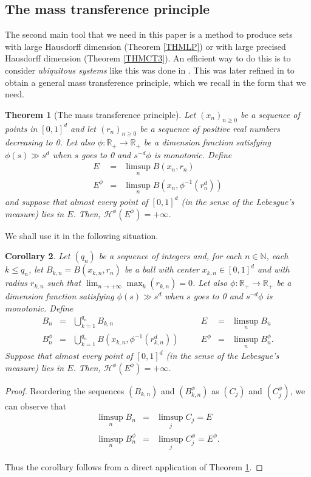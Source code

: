 \documentclass[11pt,a4paper]{amsart}
\theoremstyle{plain}
\newtheorem{theorem}{Theorem}[section]
\newtheorem{corollary}[theorem]{Corollary}
\begin{document}
\subsection{The mass transference principle}

The second main tool that we need in this paper is a method to produce sets with large Hausdorff dimension (Theorem \ref{THMLP})
or with large precised Hausdorff dimension (Theorem \ref{THMCT3}). An efficient way to do this
is to consider \emph{ubiquitous systems} like this was done in \cite{DMPV95,Jaf00b}. This was later refined in \cite{BV06} to obtain a general mass transference principle, which we recall in the form that we need.

\begin{theorem}[The mass transference principle]\label{THMUBI2}
Let $(x_n)_{n\ge 0}$ be a sequence of points in $[0,1]^d$ and let $(r_n)_{n\ge 0}$
be a sequence of positive real numbers decreasing to 0. Let also $\phi:\mathbb R_+\to\mathbb R_+$ 
be a dimension function satisfying $\phi(s)\gg s^d$ when $s$
goes to 0 and $s^{-d}\phi$ is monotonic. Define
\begin{eqnarray*}
E&=&\limsup_n B(x_n,r_n)\\
E^\phi&=&\limsup_n B\left(x_n,\phi^{-1}(r_n^d)\right)
\end{eqnarray*}
and suppose that almost every point of $[0,1]^d$ (in the sense of the
Lebesgue's measure) lies in $E$. Then,
$\mathcal{H}^\phi(E^\phi)=+\infty$.
\end{theorem}

We shall use it in the following situation.
\begin{corollary}\label{CORUBI2}
 Let $(q_n)$ be a sequence of integers and, for each $n\in\mathbb N$, each $k\leq q_n$, let
 $B_{k,n}=B(x_{k,n},r_n)$ be a ball with center $x_{k,n}\in[0,1]^d$ and with radius $r_{k,n}$
 such that $\lim_{n\to+\infty}\max_k(r_{k,n})=0$. Let also 
 $\phi:\mathbb R_+\to\mathbb R_+$ 
be a dimension function satisfying $\phi(s)\gg s^d$ when $s$
goes to 0 and $s^{-d}\phi$ is monotonic. Define
$$\begin{array}{rclcrcl}
 B_n&=&\bigcup_{k=1}^{q_n}B_{k,n}&\quad&E&=&\limsup_n B_n\\
 B_n^\phi&=&\bigcup_{k=1}^{q_n}B(x_{k,n},\phi^{-1}(r_{k,n}^d))&\quad&E^\phi&=&\limsup_n B_n^\phi.
\end{array}
$$
Suppose that almost every point of $[0,1]^d$ (in the sense of the
Lebesgue's measure) lies in $E$. Then,
$\mathcal{H}^\phi(E^\phi)=+\infty$.
\end{corollary}
\begin{proof}
 Reordering the sequences $(B_{k,n})$ and $(B_{k,n}^\phi)$ as $(C_j)$ and $(C^\phi_j)$, we can observe that
 \begin{eqnarray*}
\limsup_n B_n&=&\limsup_j C_j=E\\
 \limsup_n B_n^\phi&=&\limsup_j C_j^\phi=E^\phi.
  \end{eqnarray*}
  
 Thus the corollary follows from a direct application of Theorem \ref{THMUBI2}.
\end{proof}
\end{document}
